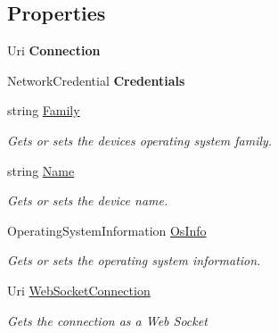 \subsection*{Properties}
\begin{DoxyCompactItemize}
\item 
Uri {\bfseries Connection}\hypertarget{class_test_app_h_l_1_1_universal_windows_1_1_device_portal_connection_a9372a9dd4ff990073aa6891a413b35d0}{}\label{class_test_app_h_l_1_1_universal_windows_1_1_device_portal_connection_a9372a9dd4ff990073aa6891a413b35d0}

\item 
Network\+Credential {\bfseries Credentials}\hypertarget{class_test_app_h_l_1_1_universal_windows_1_1_device_portal_connection_a87d2090a220f0fdffe927bbebd4ad95d}{}\label{class_test_app_h_l_1_1_universal_windows_1_1_device_portal_connection_a87d2090a220f0fdffe927bbebd4ad95d}

\item 
string \hyperlink{class_test_app_h_l_1_1_universal_windows_1_1_device_portal_connection_aeb7782e5e3d3eb866205c8c53cc746a2}{Family}
\begin{DoxyCompactList}\small\item\em Gets or sets the device\textquotesingle{}s operating system family. \end{DoxyCompactList}\item 
string \hyperlink{class_test_app_h_l_1_1_universal_windows_1_1_device_portal_connection_a88aeed82f8ded994e22b80b2fd0c5640}{Name}
\begin{DoxyCompactList}\small\item\em Gets or sets the device name. \end{DoxyCompactList}\item 
Operating\+System\+Information \hyperlink{class_test_app_h_l_1_1_universal_windows_1_1_device_portal_connection_a9d88216506d3e4ba91b7d47adddc1139}{Os\+Info}
\begin{DoxyCompactList}\small\item\em Gets or sets the operating system information. \end{DoxyCompactList}\item 
Uri \hyperlink{class_test_app_h_l_1_1_universal_windows_1_1_device_portal_connection_a17da4cebf5c86f102bc7b06f4a699888}{Web\+Socket\+Connection}
\begin{DoxyCompactList}\small\item\em Gets the connection as a Web Socket \end{DoxyCompactList}\end{DoxyCompactItemize}


